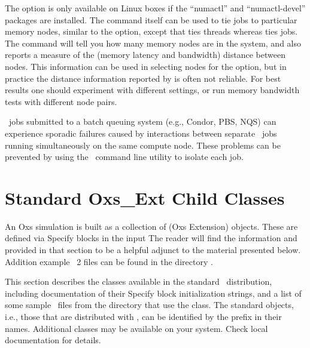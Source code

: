 The  option is only available on Linux boxes if the
``numactl'' and ``numactl-devel'' packages are installed.  The
 command itself can be used to tie jobs to particular memory
nodes, similar to the  option, except that
 ties threads whereas  ties jobs.  The
 command will tell you how many memory nodes are
in the system, and also reports a measure of the (memory latency and
bandwidth) distance between nodes.  This information can be used in
selecting nodes for the  option, but in
practice the distance information reported by  is often not
reliable.  For best results one should experiment with different
settings, or run memory bandwidth tests with different node
pairs.

\OOMMF\ jobs submitted to a batch queuing system (e.g., Condor, PBS,
NQS) can experience sporadic failures caused by interactions between
separate \OOMMF\ jobs running simultaneously on the same compute
node.  These problems can be prevented by using the \OOMMF\ command
line utility
to isolate each job.


\section{Standard Oxs\_Ext Child Classes}\label{sec:oxsext}%
An Oxs simulation is built as a collection of  (Oxs
Extension) objects.  These are defined via Specify blocks in the input
The reader will find the information and
 provided in that section to be a helpful
adjunct to the material presented below.  Addition example \MIF~2
files can be found in the directory .

This section describes the  classes available in the
standard \OOMMF\ distribution, including documentation of their Specify
block initialization strings, and a list of some sample \MIF\ files from
the  directory that use the class.  The
standard  objects, i.e., those that are distributed with
\OOMMF, can be identified by the  prefix in their names.
Additional  classes may be available on your system.  Check
local documentation for details.

